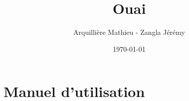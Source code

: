 \documentclass[12pt]{article}
\title{Ouai}
\author{Arquillière Mathieu - Zangla Jérémy}
\date{\today}
\begin{document}
\begin{titlepage}
  \maketitle
\end{titlepage}

\tableofcontents
\listoffigures

\newpage

\newpage
\newpage
\newpage


\newpage
\appendix
\section{Manuel d'utilisation}
\end{document}
